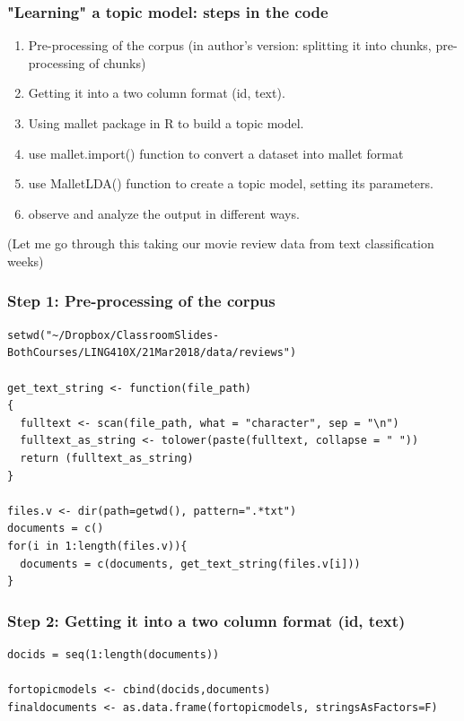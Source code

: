 \documentclass{beamer}
\begin{document}
\begin{frame}
\frametitle{"Learning" a topic model: steps in the code}
\begin{enumerate}
\item Pre-processing of the corpus (in author's version: splitting it into chunks, pre-processing of chunks)
\item Getting it into a two column format (id, text).
\item Using mallet package in R to build a topic model.
\item use mallet.import() function to convert a dataset into mallet format
\item use MalletLDA() function to create a topic model, setting its parameters. 
\item observe and analyze the output in different ways. 
\end{enumerate}
(Let me go through this taking our movie review data from text classification weeks)
\end{frame}

\begin{frame}[fragile]
\frametitle{Step 1: Pre-processing of the corpus}
\scriptsize
\begin{verbatim}
setwd("~/Dropbox/ClassroomSlides-BothCourses/LING410X/21Mar2018/data/reviews")

get_text_string <- function(file_path)
{
  fulltext <- scan(file_path, what = "character", sep = "\n")
  fulltext_as_string <- tolower(paste(fulltext, collapse = " "))
  return (fulltext_as_string)
}

files.v <- dir(path=getwd(), pattern=".*txt")
documents = c()
for(i in 1:length(files.v)){
  documents = c(documents, get_text_string(files.v[i]))
}
\end{verbatim}
\end{frame}

\begin{frame}[fragile]
\frametitle{Step 2: Getting it into a two column format (id, text)}
\scriptsize
\begin{verbatim}
docids = seq(1:length(documents))

fortopicmodels <- cbind(docids,documents)
finaldocuments <- as.data.frame(fortopicmodels, stringsAsFactors=F)
\end{verbatim}
\end{frame}
\end{document}
